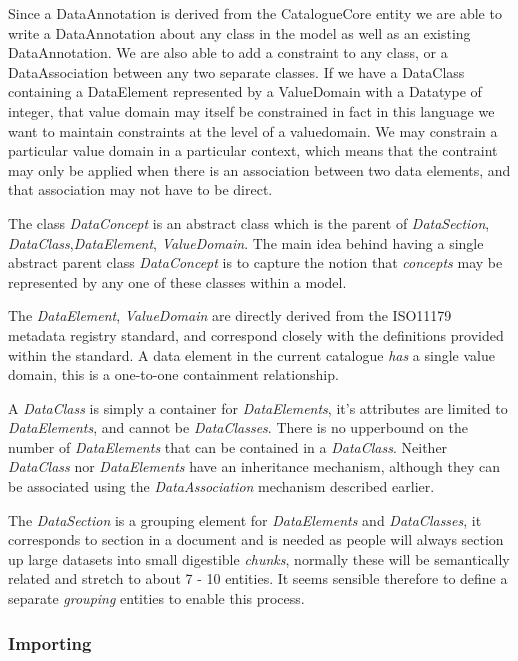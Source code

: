 \documentclass{article}
\begin{document}
Since a DataAnnotation is derived from the CatalogueCore entity we are able to write a DataAnnotation about any class in the model as well as an existing DataAnnotation. We are also able to add a constraint to any class, or a DataAssociation between any two separate classes. If we have a DataClass containing a DataElement represented by a ValueDomain with a Datatype of integer, that value domain may itself be constrained in fact in this language we want to maintain constraints at the level of a valuedomain. We may constrain a particular value domain in a particular context, which means that the contraint may only be applied when there is an association between two data elements, and that association may not have to be direct.


The class \emph{DataConcept} is an abstract class which is the parent of \emph{DataSection}, \emph{DataClass},\emph{DataElement}, \emph{ValueDomain}. The main idea behind having a single abstract parent class  \emph{DataConcept}  is to capture the notion that \emph{concepts} may be represented by any one of these classes within a model.  

The \emph{DataElement}, \emph{ValueDomain} are directly derived from the ISO11179 metadata registry standard, and correspond closely with the definitions provided within the standard. A data element in the current catalogue \emph{has} a single value domain, this is a one-to-one containment relationship. 

A \emph{DataClass} is simply a container for \emph{DataElements}, it's attributes are limited to \emph{DataElements}, and cannot be  \emph{DataClasses}. There is no upperbound on the number of \emph{DataElements} that can be contained in a \emph{DataClass}. Neither \emph{DataClass} nor \emph{DataElements} have an inheritance mechanism, although they can be associated using the \emph{DataAssociation} mechanism described earlier.

The \emph{DataSection} is a grouping element for \emph{DataElements} and \emph{DataClasses}, it corresponds to section in a document and is needed as people will always section up large datasets into small digestible \emph{chunks}, normally these will be semantically related and stretch to about 7 - 10 entities. It seems sensible therefore to define a separate \emph{grouping} entities to enable this process. 

\subsubsection{Importing}
\end{document}
